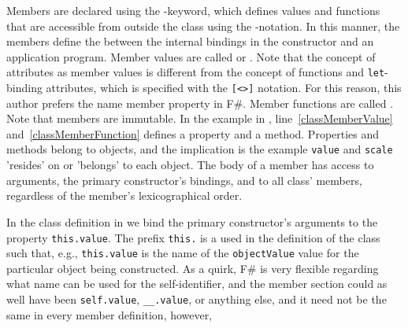 Members are declared using the -keyword, which defines values and functions that are accessible from outside the class using the -notation. In this manner, the members define the  between the internal bindings in the constructor and an application program. Member values are called  or . Note that the concept of attributes as member values is different from the concept of functions and \lstinline{let}-binding attributes, which is specified with the \lstinline{[<>]} notation. For this reason, this author prefers the name member property in F\#. Member functions are called . Note that members are immutable.  In the example in , line~\ref{classMemberValue} and~\ref{classMemberFunction} defines a property and a method. Properties and methods belong to objects, and the implication is the example \lstinline{value} and \lstinline{scale} 'resides' on or 'belongs' to each object.  The body of a member has access to arguments, the primary constructor's bindings, and to all class' members, regardless of the member's lexicographical order. 

In the class definition in  we bind the primary constructor's arguments to the property \lstinline{this.value}. The prefix \lstinline{this.} is a  used in the definition of the class such that, e.g., \lstinline{this.value} is the name of the \lstinline{objectValue} value for the particular object being constructed. As a quirk, F\# is very flexible regarding what name can be used for the self-identifier, and the member section could as well have been \lstinline{self.value}, \lstinline{__.value}, or anything else, and it need not be the same in every member definition, however, 

